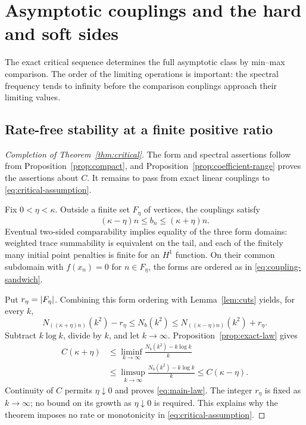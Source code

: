 \section{Asymptotic couplings and the hard and soft sides}
\label{sec:general}

The exact critical sequence determines the full asymptotic
class by min--max comparison. The order of the limiting
operations is important: the spectral frequency tends to
infinity before the comparison couplings approach their
limiting values.

\subsection{Rate-free stability at a finite positive ratio}

\begin{proof}[Completion of Theorem~\ref{thm:critical}]
The form and spectral assertions follow from
Proposition~\ref{prop:compact}, and
Proposition~\ref{prop:coefficient-range} proves the assertions
about $C$. It remains to pass from exact linear couplings
to \eqref{eq:critical-assumption}.

Fix $0<\eta<\kappa$. Outside a finite set $F_\eta$ of
vertices, the couplings satisfy
\begin{equation}
 (\kappa-\eta)n\le b_n\le(\kappa+\eta)n.
 \label{eq:coupling-sandwich}
\end{equation}
Eventual two-sided comparability implies equality of the
three form domains: weighted trace summability is equivalent
on the tail, and each of the finitely many initial point
penalties is finite for an $H^1$ function. On their common
subdomain with $f(x_n)=0$ for $n\in F_\eta$, the forms
are ordered as in \eqref{eq:coupling-sandwich}.

Put $r_\eta=\lvert F_\eta\rvert$. Combining this form ordering
with Lemma~\ref{lem:cuts} yields, for every $k$,
\begin{equation}
 N_{((\kappa+\eta)n)}(k^2)-r_\eta
       \le N_b(k^2)
       \le N_{((\kappa-\eta)n)}(k^2)+r_\eta.
 \label{eq:count-sandwich}
\end{equation}
Subtract $k\log k$, divide by $k$, and let $k\to\infty$.
Proposition~\ref{prop:exact-law} gives
\begin{align*}
 C(\kappa+\eta)
 &\le\liminf_{k\to\infty}\frac{N_b(k^2)-k\log k}{k}\\
 &\le\limsup_{k\to\infty}\frac{N_b(k^2)-k\log k}{k}
 \le C(\kappa-\eta).
\end{align*}
Continuity of $C$ permits $\eta\downarrow0$ and proves
\eqref{eq:main-law}. The integer $r_\eta$ is fixed as
$k\to\infty$; no bound on its growth as $\eta\downarrow0$
is required. This explains why the theorem imposes no rate
or monotonicity in \eqref{eq:critical-assumption}.
\end{proof}


